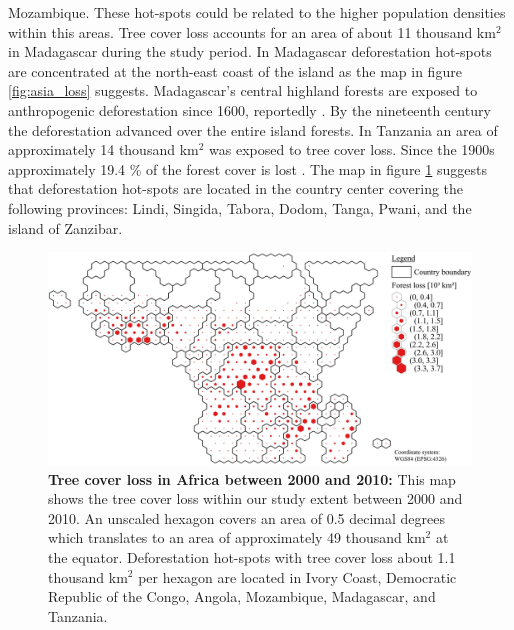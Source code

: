Mozambique. These hot-spots could be related to the higher population densities within this areas. Tree cover loss accounts for an area of about 11 thousand km$^2$ in Madagascar during the study period. In Madagascar deforestation hot-spots are concentrated at the north-east coast of the island as the map in figure \ref{fig:asia_loss} suggests. Madagascar's central highland forests are exposed to anthropogenic deforestation since 1600, reportedly \citep{Harper2007}. By the nineteenth century the deforestation advanced over the entire island forests. In Tanzania an area of approximately 14 thousand km$^2$ was exposed to tree cover loss. Since the 1900s approximately 19.4 \% of the forest cover is lost \citep{Kideghesho2015}. The map in figure \ref{fig:africa_loss} suggests that deforestation hot-spots are located in the country center covering the following provinces: Lindi, Singida, Tabora, Dodom, Tanga, Pwani, and the island of Zanzibar.
			\begin{figure}[ht]
				\centering
				\includegraphics[scale=.9]{img/africa_loss_frameless}
				\caption[Tree cover loss in Africa between 2000 and 2010]{\textbf{Tree cover loss in Africa between 2000 and 2010:} This map shows the tree cover loss within our study extent between 2000 and 2010. An unscaled hexagon covers an area of 0.5 decimal degrees which translates to an area of approximately 49 thousand km$^2$ at the equator. Deforestation hot-spots with tree cover loss about 1.1 thousand km$^2$ per hexagon are located in Ivory Coast, Democratic Republic of the Congo, Angola, Mozambique, Madagascar, and Tanzania.}
				\label{fig:africa_loss}
			\end{figure}

